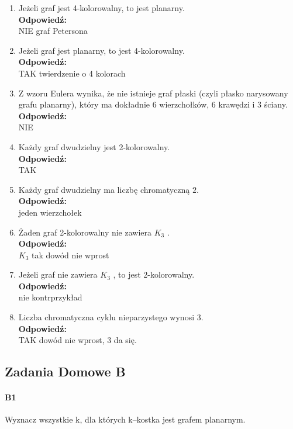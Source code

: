 \begin{enumerate}[label=\alph*)]
\item Jeżeli graf jest 4-kolorowalny, to jest planarny.
\\\textbf{Odpowiedź:} \\ NIE graf Petersona 

\item Jeżeli graf jest planarny, to jest 4-kolorowalny.
\\\textbf{Odpowiedź:} \\ TAK twierdzenie o 4 kolorach

\item Z wzoru Eulera wynika, że nie istnieje graf płaski (czyli płasko narysowany grafu planarny), który ma dokładnie $6$ wierzchołków, $6$ krawędzi i $3$ ściany.
\\\textbf{Odpowiedź:} \\ NIE

\item Każdy graf dwudzielny jest 2-kolorowalny.
\\\textbf{Odpowiedź:} \\ TAK

\item Każdy graf dwudzielny ma liczbę chromatyczną $2$.
\\\textbf{Odpowiedź:} \\ jeden wierzchołek

\item Żaden graf 2-kolorowalny nie zawiera $K_3$ .
\\\textbf{Odpowiedź:} \\ $K_3$ tak dowód nie wprost

\item Jeżeli graf nie zawiera $K_3$ , to jest 2-kolorowalny.
\\\textbf{Odpowiedź:} \\ nie kontrprzykład

\item Liczba chromatyczna cyklu nieparzystego wynosi $3$.
\\\textbf{Odpowiedź:} \\ TAK dowód nie wprost, 3 da się.

\end{enumerate}

\subsection{Zadania Domowe B}
\paragraph{B1} Wyznacz wszystkie k, dla których k–kostka jest grafem planarnym.

